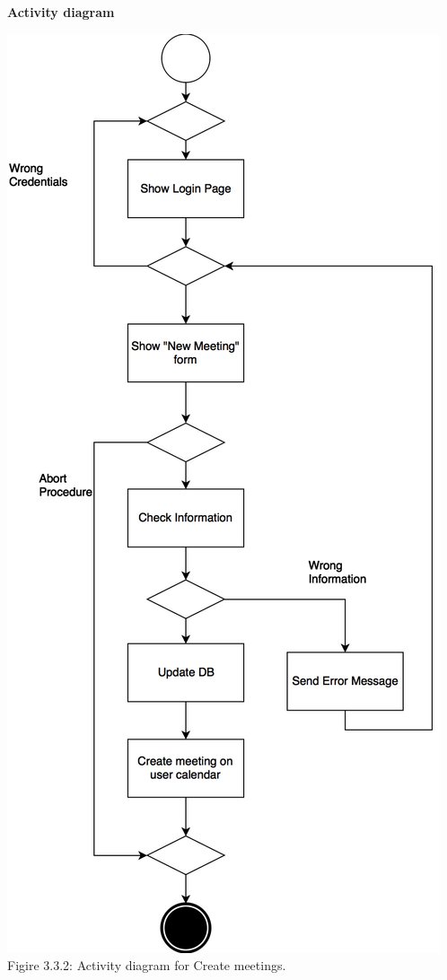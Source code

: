 \documentclass{article}
\begin{document}
	\newpage
	\noindent
	\textbf{Activity diagram} \\
	
	\begin{center}
		\includegraphics[scale=0.25]{img/diagrams/create_meetings_ad.png} \\ \bigskip
		Figire 3.3.2: Activity diagram for Create meetings.
	\end{center}
	
\end{document}
